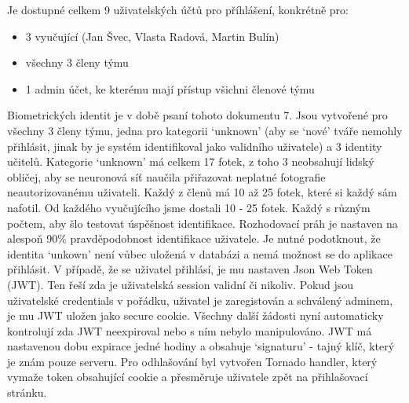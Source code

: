 Je dostupné celkem 9 uživatelských účtů pro příhlášení, konkrétně pro: 
\begin{itemize}
    \item 3 vyučující (Jan Švec, Vlasta Radová, Martin Bulín)%
    \item všechny 3 členy týmu
    \item 1 admin účet, ke kterému mají přístup všichni členové týmu
\end{itemize}
Biometrických identit je v době psaní tohoto dokumentu 7. Jsou vytvořené pro všechny 3 členy týmu, jedna pro kategorii `unknown' (aby se `nové' tváře nemohly přihlásit, jinak by je systém identifikoval jako validního uživatele) a 3 identity učitelů. 
Kategorie `unknown' má celkem 17 fotek, z toho 3 neobsahují lidský obličej, aby se neuronová síť naučila přiřazovat neplatné fotografie neautorizovanému uživateli.
Každý z členů má 10 až 25 fotek, které si každý sám nafotil.
Od každého vyučujícího jsme dostali 10 - 25 fotek. Každý s různým počtem, aby šlo testovat úspěšnost identifikace.
Rozhodovací práh je nastaven na alespoň 90\% pravděpodobnost identifikace uživatele. 
Je nutné podotknout, že identita `unkown' není vůbec uložená v databázi a nemá možnost se do aplikace přihlásit.
V případě, že se uživatel přihlásí, je mu nastaven Json Web Token (JWT). Ten řeší zda je uživatelská session validní či nikoliv.
Pokud jsou uživatelské credentials v pořádku, uživatel je zaregistován a schválený adminem, je mu JWT uložen jako secure cookie.
Všechny další žádosti nyní automaticky kontrolují zda JWT neexpiroval nebo s ním nebylo manipulováno. 
JWT má nastavenou dobu expirace jedné hodiny a obsahuje `signaturu' - tajný klíč, který je znám pouze serveru.  
Pro odhlašování byl vytvořen Tornado handler, který vymaže token obsahující cookie a přesměruje uživatele zpět na přihlašovací stránku.